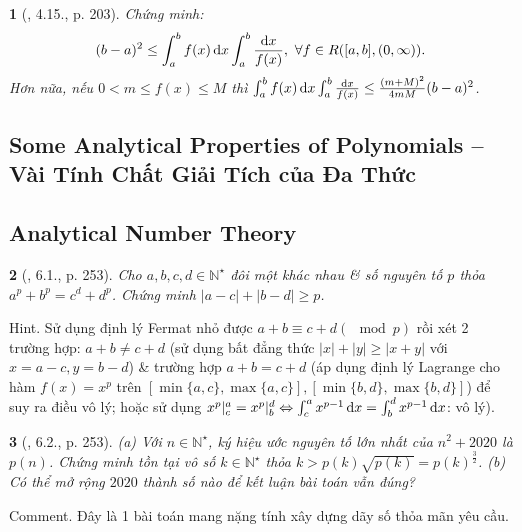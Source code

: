 \documentclass{article}
\newtheorem{baitoan}{}
\begin{document}
\begin{baitoan}[\cite{Quoc_Long_Dat_Nam_VMC}, 4.15., p. 203]
	Chứng minh:
	\begin{equation*}
		(b - a)^2\le\int_a^b f(x)\,{\rm d}x\int_a^b \frac{{\rm d}x}{f(x)},\ \forall f\in R([a,b],(0,\infty)).
	\end{equation*}
	Hơn nữa, nếu $0 < m\le f(x)\le M$ thì $\int_a^b f(x)\,{\rm d}x\int_a^b \frac{{\rm d}x}{f(x)}\le\frac{(m + M)^2}{4mM}(b - a)^2$.
\end{baitoan}


\subsection{Some Analytical Properties of Polynomials -- Vài Tính Chất Giải Tích của Đa Thức}


\subsection{Analytical Number Theory}

\begin{baitoan}[\cite{Quoc_Long_Dat_Nam_VMC}, 6.1., p. 253]
	Cho $a,b,c,d\in\mathbb{N}^\star$ đôi một khác nhau \& số nguyên tố $p$ thỏa $a^p + b^p = c^d + d^p$. Chứng minh $|a - c| + |b - d|\ge p$.
\end{baitoan}
{\sf Hint.} Sử dụng định lý Fermat nhỏ được $a + b\equiv c + d(\mod p)$ rồi xét 2 trường hợp: $a + b\ne c + d$ (sử dụng bất đẳng thức $|x| + |y|\ge|x + y|$ với $x = a - c,y = b - d$) \& trường hợp $a + b = c + d$ (áp dụng định lý Lagrange cho hàm $f(x) = x^p$ trên $[\min\{a,c\},\max\{a,c\}],[\min\{b,d\},\max\{b,d\}]$) để suy ra điều vô lý; hoặc sử dụng $x^p|_c^a = x^p|_b^d\Leftrightarrow\int_c^a x^{p-1}\,{\rm d}x = \int_b^d x^{p-1}\,{\rm d}x$: vô lý).

\begin{baitoan}[\cite{Quoc_Long_Dat_Nam_VMC}, 6.2., p. 253]
	(a) Với $n\in\mathbb{N}^\star$, ký hiệu ước nguyên tố lớn nhất của $n^2 + 2020$ là $p(n)$. Chứng minh tồn tại vô số $k\in\mathbb{N}^\star$ thỏa $k > p(k)\sqrt{p(k)} = p(k)^{\frac{3}{2}}$. (b) Có thể mở rộng $2020$ thành số nào để kết luận bài toán vẫn đúng?
\end{baitoan}
{\sf Comment.} Đây là 1 bài toán mang nặng tính xây dựng dãy số thỏa mãn yêu cầu.
\end{document}
